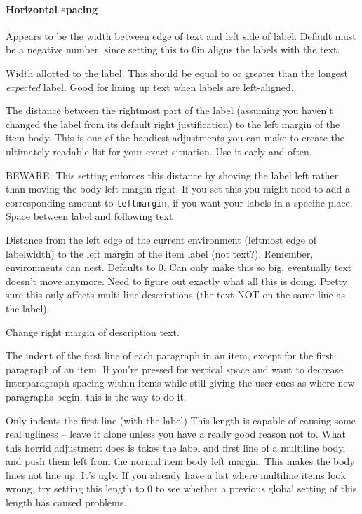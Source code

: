 \documentclass{article}
\begin{document}
\paragraph{Horizontal spacing}
\begin{description}[labelindent=2cm, leftmargin=\labelindent,
        ]
    \item [labelindent] Appears to be the width between edge of text
        and left side of label. Default must be a negative number, since
        setting this to 0in aligns the labels with the text.
    \item [labelwidth]
        Width allotted to the label. This should be equal to or
        greater than the longest \emph{expected} label.  Good for
        lining up text when labels are left-aligned.
    \item [labelsep]
        The distance between the rightmost part of the label (assuming
        you haven't changed the label from its default right
        justification) to the left margin of the item body. This is
        one of the handiest adjustments you can make to create the
        ultimately readable list for your exact situation. Use it
        early and often.

        BEWARE\@: This setting enforces this distance by shoving the
        label left rather than moving the body left margin right. If
        you set this you might need to add a corresponding amount to
        \texttt{leftmargin}, if you want your labels in a specific place.
        Space between label and following text
    \item [leftmargin] Distance from the left edge of the current
        environment (leftmost edge of labelwidth) to the left margin of the
        item label (not text?). Remember, environments can nest. Defaults to 0.
        Can only make this so big, eventually text doesn't move anymore.
        Need to figure out exactly what all this is doing.
        Pretty sure this only affects multi-line descriptions
        (the text NOT on the same line as the label).
    \item [rightmargin] Change right margin of description text.
    \item [listparindent] The indent of the first line of each
        paragraph in an item, except for the first paragraph of an
        item. If you're pressed for vertical space and want to
        decrease interparagraph spacing within items while still
        giving the user cues as where new paragraphs begin, this is
        the way to do it.
    \item [itemindent] Only indents the first line (with the label)
        This length is capable of causing some real ugliness -- leave
        it alone unless you have a really good reason not to. What
        this horrid adjustment does is takes the label and first line
        of a multiline body, and push them left from the normal item
        body left margin. This makes the body lines not line up. It's
        ugly. If you already have a list where multiline items look
        wrong, try setting this length to 0 to see whether a previous
        global setting of this length has caused problems.


\end{description}
\end{document}

